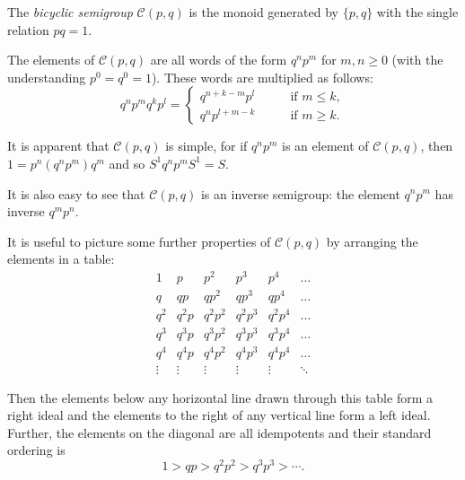 \documentclass[12pt]{article}
\newcommand{\Bicyc}[2]{\mathcal{C}({#1},{#2})}
\begin{document}
The \emph{bicyclic semigroup} $\Bicyc{p}{q}$ is the
monoid generated by $\{p, q\}$ with
the single relation $pq = 1$.

The elements of $\Bicyc{p}{q}$ are all words of the
form $q^n p^m$ for $m, n \geq 0$ (with the understanding $p^0 = q^0 = 1$).
These words are multiplied as follows:
\begin{displaymath}
  q^n p^m q^k p^l = \begin{cases}
    q^{n+k-m} p^l \qquad & \text{if }m \leq k, \\
    q^n p^{l+m-k}        & \text{if }m \geq k.
  \end{cases}
\end{displaymath}

It is apparent that $\Bicyc{p}{q}$ is simple, for if
$q^n p^m$ is an element of $\Bicyc{p}{q}$, then
$1 = p^n (q^n p^m) q^m$ and so $S^1q^n p^mS^1 = S$.

It is also easy to see that $\Bicyc{p}{q}$ is an inverse semigroup: the element $q^np^m$ has inverse $q^mp^n$.

It is useful to picture some further properties of $\Bicyc{p}{q}$ by
arranging the elements in a table:
\begin{displaymath}
  \begin{matrix}
    1   & p    & p^2    & p^3    & p^4    & \dots \\
    q   & qp   & qp^2   & qp^3   & qp^4   & \dots \\
    q^2 & q^2p & q^2p^2 & q^2p^3 & q^2p^4 & \dots \\
    q^3 & q^3p & q^3p^2 & q^3p^3 & q^3p^4 & \dots \\
    q^4 & q^4p & q^4p^2 & q^4p^3 & q^4p^4 & \dots \\
	\vdots & \vdots & \vdots & \vdots & \vdots & \ddots
  \end{matrix}
\end{displaymath}

Then the elements below any horizontal line drawn through this
table form a right ideal and the elements to the right of any vertical
line form a left ideal.
Further, the elements on the diagonal are all idempotents
and their standard ordering is
$$1 > qp > q^2 p^2 > q^3 p^3 > \dotsb.$$
\end{document}
